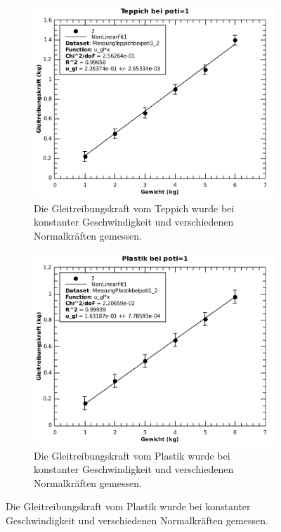\begin{figure}[H]
    \centering
    \begin{subfigure}{.5\textwidth}
        \includegraphics[width=\linewidth]{images/teppich_const_geschwindigkeit}
        \caption{Die Gleitreibungskraft vom Teppich wurde bei konstanter Geschwindigkeit und verschiedenen Normalkr\"aften gemessen.}
    \end{subfigure}
    \begin{subfigure}{.5\textwidth}
        \includegraphics[width=\linewidth]{images/plastik_const_geschwindigkeit}
        \caption{Die Gleitreibungskraft vom Plastik wurde bei konstanter Geschwindigkeit und verschiedenen Normalkr\"aften gemessen.}
    \end{subfigure}
\end{figure}
